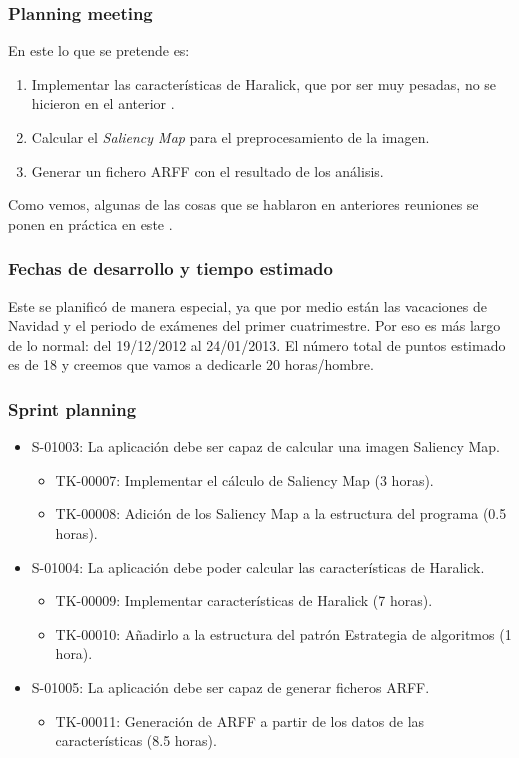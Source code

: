 \subsubsection*{Planning meeting}
En este \sprint{} lo que se pretende es:

\begin{enumerate}
\item Implementar las características de Haralick, que por ser muy pesadas, no se hicieron en el anterior \sprint{}.
\item Calcular el \textit{Saliency Map} para el preprocesamiento de la imagen.
\item Generar un fichero ARFF con el resultado de los análisis.
\end{enumerate}

Como vemos, algunas de las cosas que se hablaron en anteriores reuniones se ponen en práctica en este \sprint{}.

\subsubsection*{Fechas de desarrollo y tiempo estimado}
Este \sprint{} se planificó de manera especial, ya que por medio están las vacaciones de Navidad y el periodo de exámenes del primer cuatrimestre. Por eso es más largo de lo normal: del 19/12/2012 al 24/01/2013. El número total de puntos estimado es de 18 y creemos que vamos a dedicarle 20 horas/hombre.

\subsubsection*{Sprint planning}
\begin{itemize}
 \item S-01003: La aplicación debe ser capaz de calcular una imagen Saliency Map.
 \begin{itemize}
  \item TK-00007: Implementar el cálculo de Saliency Map (3 horas).
  \item TK-00008: Adición de los Saliency Map a la estructura del programa (0.5 horas).
 \end{itemize} 
 \item S-01004: La aplicación debe poder calcular las características de Haralick.
 \begin{itemize}
  \item TK-00009: Implementar características de Haralick (7 horas).
  \item TK-00010: Añadirlo a la estructura del patrón Estrategia de algoritmos (1 hora).
 \end{itemize}
 \item S-01005: La aplicación debe ser capaz de generar ficheros ARFF.
 \begin{itemize}
  \item TK-00011: Generación de ARFF a partir de los datos de las características (8.5 horas).
 \end{itemize}
\end{itemize}

